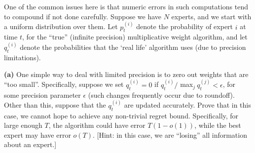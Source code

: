 \documentclass[11pt]{article}
\renewcommand\part[1]{\vspace{.10in}\textbf{(#1)}}
\begin{document}
One of the common issues here is that numeric errors in such computations tend to compound if not done carefully. Suppose we have $N$ experts, and we start with a uniform distribution over them. Let $p_t^{(i)}$ denote the probability of expert $i$ at time $t$, for the ``true'' (infinite precision) multiplicative weight algorithm, and let $q_t^{(i)}$ denote the probabilities that the `real life' algorithm uses (due to precision limitations).

\part{a} One simple way to deal with limited precision is to zero out weights that are ``too small''. Specifically, suppose we set $q_t^{(i)} = 0$ if $q_t^{(i)} /$ max$_j \ q_t^{(j)} < \epsilon$, for some precision parameter $\epsilon$ (such changes frequently occur due to roundoff). Other than this, suppose that the $q_t^{(i)}$ are updated accurately. Prove that in this case, we cannot hope to achieve any non-trivial regret bound. Specifically, for large enough $T$, the algorithm could have error $T(1 - o(1))$, while the best expert may have error $o(T)$. [Hint: in this case, we are ``losing'' all information about an expert.]
\end{document}
